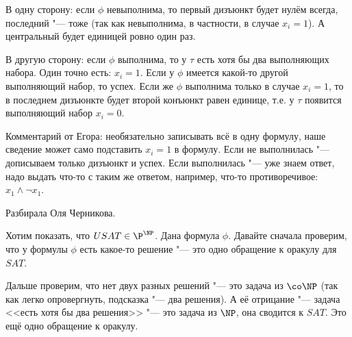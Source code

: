 	В одну сторону: если $\phi$ невыполнима, то первый дизъюнкт будет нулём всегда, последний "--- тоже (так как невыполнима, в частности, в случае $x_i=1$).
	А центральный будет единицей ровно один раз.

	В другую сторону: если $\phi$ выполнима, то у $\tau$ есть хотя бы два выполняющих набора.
	Один точно есть: $x_i=1$.
	Если у $\phi$ имеется какой-то другой выполняющий набор, то успех.
	Если же $\phi$ выполнима только в случае $x_i=1$, то в последнем дизъюнкте будет второй конъюнкт равен единице,
	т.е. у $\tau$ появится выполняющий набор $x_i=0$.

	\begin{Rem}
		Комментарий от Егора: необязательно записывать всё в одну формулу, наше сведение может само подставить $x_i=1$ в формулу.
		Если не выполнилась "--- дописываем только дизъюнкт и успех.
		Если выполнилась "--- уже знаем ответ, надо выдать что-то с таким же ответом, например, что-то противоречивое: $x_1 \land \lnot x_1$.
	\end{Rem}

	Разбирала Оля Черникова.

	Хотим показать, что $USAT \in \P^{\NP}$.
	Дана формула $\phi$.
	Давайте сначала проверим, что у формулы $\phi$ есть какое-то решение "--- это одно обращение к оракулу для $SAT$.

	Дальше проверим, что нет двух разных решений "--- это задача из $\co\NP$ (так как легко опровергнуть, подсказка "--- два решения).
	А её отрицание "--- задача <<есть хотя бы два решения>> "--- это задача из $\NP$, она сводится к $SAT$.
	Это ещё одно обращение к оракулу.
